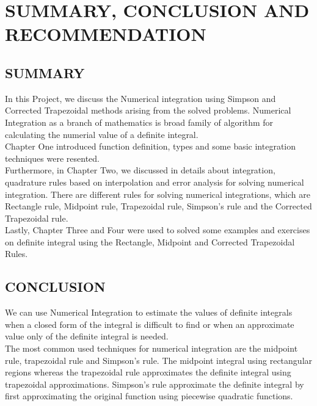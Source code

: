 \documentclass[12pt]{report}
\newcommand{\NI}{\noindent}
\begin{document}
	
	
	
	
	\chapter{SUMMARY, CONCLUSION AND RECOMMENDATION}
	\section{SUMMARY}
	In this Project, we discuss the Numerical integration using Simpson and Corrected Trapezoidal methods arising from the solved problems. Numerical Integration as a branch of mathematics is broad family of algorithm for calculating the numerial value of a definite integral.\\
	
	\NI Chapter One introduced function definition, types and some basic integration techniques were resented.\\
	
	\NI Furthermore, in Chapter Two, we discussed in details about integration, quadrature rules based on interpolation and error analysis for solving numerical integration. There are different rules for solving numerical integrations, which are Rectangle rule, Midpoint rule, Trapezoidal rule, Simpson's rule and the Corrected Trapezoidal rule.\\
	
	\NI Lastly, Chapter Three and Four were used to solved some examples and exercises on definite integral using the Rectangle, Midpoint and Corrected Trapezoidal Rules. \\
	
	
	\section{CONCLUSION} 
	We can use Numerical Integration to estimate the values of definite integrals when a closed form of the integral is difficult to find or when an approximate value only of the definite integral is needed. \\
	
	\NI The most common used techniques for numerical integration are the midpoint rule, trapezoidal rule and Simpson's rule. The midpoint integral using rectangular regions whereas the trapezoidal rule approximates the definite integral using trapezoidal approximations. Simpson's rule approximate the definite integral by first approximating the original function using piecewise quadratic functions.
	
\end{document}
